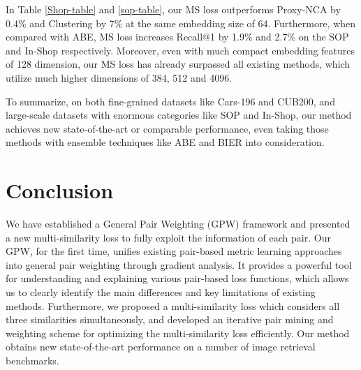 \documentclass[10pt,twocolumn,letterpaper]{article}
\begin{document}
In Table \ref{Shop-table} and \ref{sop-table}, our MS loss outperforms Proxy-NCA by 0.4\% and Clustering by 7\% at the same embedding size of 64. Furthermore, when compared with ABE, MS loss increases Recall@1 by 1.9\%  and  2.7\% on the SOP and In-Shop respectively. Moreover, even with much compact embedding features of 128 dimension, our MS loss has already surpassed all existing methods, which utilize much higher dimensions of 384, 512 and 4096.

To summarize, on both fine-grained datasets like Cars-196 and CUB200, and large-scale datasets with enormous categories like SOP and In-Shop, our method achieves new state-of-the-art or comparable performance, even taking those methods with ensemble techniques like ABE and BIER into consideration.  

\section{Conclusion}
We have established a General Pair Weighting (GPW) framework and presented a new multi-similarity loss to fully exploit the information of each pair. Our GPW, for the first time, unifies existing pair-based metric learning approaches into general pair weighting through gradient analysis. It provides a powerful tool for understanding and explaining various pair-based loss functions, which allows us to clearly identify the main differences and key limitations of existing methods. Furthermore, we proposed a multi-similarity loss which considers all three similarities simultaneously, and developed an iterative pair mining and weighting scheme for optimizing the multi-similarity loss efficiently. Our method obtains new state-of-the-art performance on a number of image retrieval benchmarks.
{\small
	
	
}

\clearpage
\clearpage



\end{document}
